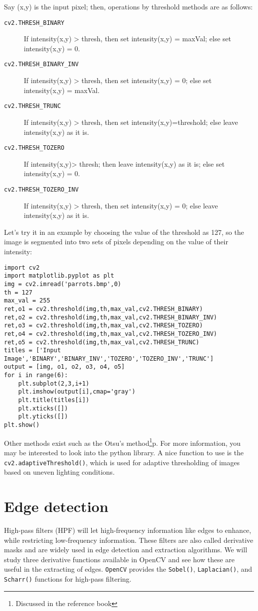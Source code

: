 \documentclass{labo}
\newcommand{\opencv}{\texttt{OpenCV} }
\begin{document}
Say (x,y) is the input pixel; then, operations by threshold methods are as follows:
\begin{description}
	\item[\texttt{cv2.THRESH\_BINARY}] If intensity(x,y) > thresh, then set intensity(x,y) = maxVal; else set intensity(x,y) = 0. 
	\item[\texttt{cv2.THRESH\_BINARY\_INV}] If intensity(x,y) > thresh, then set intensity(x,y) = 0; else set intensity(x,y) = maxVal.
	\item[\texttt{cv2.THRESH\_TRUNC}]  If intensity(x,y) > thresh, then set intensity(x,y)=threshold; else leave intensity(x,y) as it is.
	\item[\texttt{cv2.THRESH\_TOZERO}] If intensity(x,y)> thresh; then leave intensity(x,y) as it is; else set intensity(x,y) = 0.
	\item[\texttt{cv2.THRESH\_TOZERO\_INV}] If intensity(x,y) > thresh, then set intensity(x,y) = 0; else leave intensity(x,y) as it is.
\end{description}

Let’s try it in an example by choosing the value of the threshold as 127, so the image is segmented into two sets of pixels depending on the value of their intensity:

\begin{verbatim}
import cv2 
import matplotlib.pyplot as plt 
img = cv2.imread('parrots.bmp',0) 
th = 127 
max_val = 255 
ret,o1 = cv2.threshold(img,th,max_val,cv2.THRESH_BINARY) 
ret,o2 = cv2.threshold(img,th,max_val,cv2.THRESH_BINARY_INV) 
ret,o3 = cv2.threshold(img,th,max_val,cv2.THRESH_TOZERO) 
ret,o4 = cv2.threshold(img,th,max_val,cv2.THRESH_TOZERO_INV) 
ret,o5 = cv2.threshold(img,th,max_val,cv2.THRESH_TRUNC) 
titles = ['Input Image','BINARY','BINARY_INV','TOZERO','TOZERO_INV','TRUNC']
output = [img, o1, o2, o3, o4, o5] 
for i in range(6): 
	plt.subplot(2,3,i+1)
	plt.imshow(output[i],cmap='gray') 
	plt.title(titles[i]) 
	plt.xticks([])
	plt.yticks([]) 
plt.show()
\end{verbatim}

Other methods exist such as the Otsu’s method\footnote{Discussed in the reference book}p. For more information, you may be interested to look into the python library. A nice function to use is the \texttt{cv2.adaptiveThreshold()}, which is used for adaptive thresholding of images based on uneven lighting conditions.


\section*{Edge detection}
High-pass filters (HPF) will let high-frequency information like edges to enhance, while restricting low-frequency information. These filters are also called derivative masks and are widely used in edge detection and extraction algorithms. We will study three derivative functions available in OpenCV and see how these are useful in the extracting of edges. \opencv provides the \texttt{Sobel()}, \texttt{Laplacian()}, and \texttt{Scharr()} functions for high-pass filtering.\\
\end{document}
